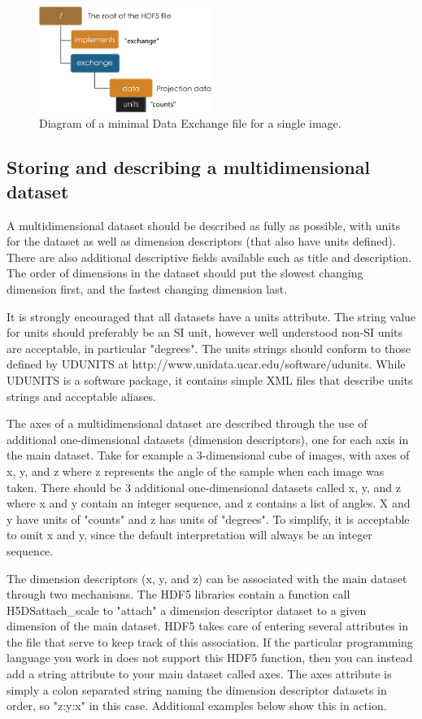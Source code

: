 \begin{figure}[h!]
\centering
\includegraphics[width=0.5\textwidth]{figures/dx_Minimal1.pdf}
\caption{Diagram of a minimal Data Exchange file for a single image.}
\label{fig:Minimal1}
\end{figure}

\subsection{Storing and describing a multidimensional dataset}
A multidimensional dataset should be described as fully as possible, with units for the dataset as well as 
dimension descriptors (that also have units defined). There are also additional descriptive fields available 
such as title and description. The order of dimensions in the dataset should put the slowest changing 
dimension first, and the fastest changing dimension last. 

It is strongly encouraged that all datasets have a units attribute. The string value for units should preferably 
be an SI unit, however well understood non-SI units are acceptable, in particular "degrees". The units 
strings should conform to those defined by UDUNITS at {http://www.unidata.ucar.edu/software/udunits}. 
While UDUNITS is a software package, it contains simple XML files that describe units strings and 
acceptable aliases.

The axes of a multidimensional dataset are described through the use of additional one-dimensional 
datasets (dimension descriptors), one for each axis in the main dataset. Take for example a 3-dimensional 
cube of images, with axes of x, y, and z where z represents the angle of the sample when each image was 
taken. There should be 3 additional one-dimensional datasets called x, y, and z where x and y contain an 
integer sequence, and z contains a list of angles. X and y have units of "counts" and z has units of 
"degrees". To simplify, it is acceptable to omit x and y, since the default interpretation will always be an 
integer sequence. 

The dimension descriptors (x, y, and z) can be associated with the main dataset through two mechanisms. 
The HDF5 libraries contain a function call H5DSattach\_scale to "attach" a dimension descriptor 
dataset to a given dimension of 
the main dataset. HDF5 takes care of entering several attributes in the file that serve to keep track of this 
association. If the particular programming language you work in does not support this HDF5 function, then 
you can instead add a string attribute to your main dataset called axes. The axes attribute is simply a colon 
separated string naming the dimension descriptor datasets in order, so "z:y:x" in this case. Additional 
examples below show this in action.

